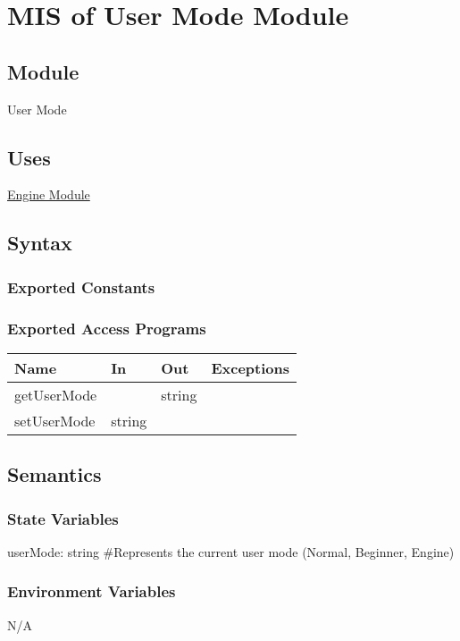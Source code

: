 \documentclass[12pt, titlepage]{article}
\begin{document}
\section{MIS of User Mode Module} \label{mMode}

    \subsection{Module}
    User Mode

    \subsection{Uses}
    \hyperref[mEngine]{Engine Module}

    \subsection{Syntax}
    \subsubsection{Exported Constants}

    \subsubsection{Exported Access Programs}
        \begin{center}
        \begin{tabular}{p{4.5cm} p{4cm} p{3cm} p{2.5cm}}
        \hline
        \textbf{Name} & \textbf{In} & \textbf{Out} & \textbf{Exceptions} \\
        \hline
        getUserMode & & string & \\
        \hline
        setUserMode & string & & \\
        \hline
        \end{tabular}
        \end{center}

    \subsection{Semantics}
    \subsubsection{State Variables}
    userMode: string \#Represents the current user mode (Normal, Beginner, Engine)

    \subsubsection{Environment Variables}
    N/A
\end{document}
